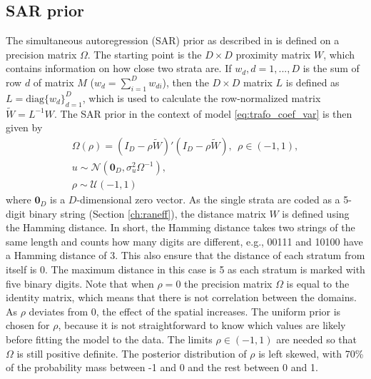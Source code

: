 \subsection{SAR prior}
The simultaneous autoregression (SAR) prior as described in \cite{chung_bayesian_2020} is defined on a precision matrix $\Omega$.
The starting point is the $D\times D$ proximity matrix $W$, which contains information on how close two strata are.
If $w_d, d = 1, ..., D$ is the sum of row $d$ of matrix $M$ ($w_d = \displaystyle \sum_{i = 1}^D w_{di}$), then the $D \times D$ matrix $L$ is defined as $L = \text{diag}\{w_d\}_{d=1}^D$, which is used to calculate the row-normalized matrix $\tilde W = L^{-1}W$.
The SAR prior in the context of model \ref{eq:trafo_coef_var} is then given by
\begin{gather*}
    \Omega(\rho) = (I_D - \rho \tilde W)'(I_D - \rho \tilde W), ~~ \rho \in (-1, 1),\\
    u \sim \mathcal N(\boldsymbol{0}_D, \sigma_u^2 \Omega^{-1}),\\
    \rho \sim \mathcal U(-1, 1)
\end{gather*}
where $\boldsymbol{0}_D$ is a $D$-dimensional zero vector.
As the single strata are coded as a 5-digit binary string (Section \ref{ch:raneff}), the distance matrix $W$ is defined using the Hamming distance.
In short, the Hamming distance takes two strings of the same length and counts how many digits are different, e.g., 00111 and 10100 have a Hamming distance of 3.
This also ensure that the distance of each stratum from itself is 0.
The maximum distance in this case is 5 as each stratum is marked with five binary digits.
Note that when $\rho = 0$ the precision matrix $\Omega$ is equal to the identity matrix, which means that there is not correlation between the domains.
As $\rho$ deviates from 0, the effect of the spatial increases.
The uniform prior is chosen for $\rho$, because it is not straightforward to know which values are likely before fitting the model to the data.
The limits $\rho \in (-1, 1)$ are needed so that $\Omega$ is still positive definite.
The posterior distribution of $\rho$ is left skewed, with 70\% of the probability mass between -1 and 0 and the rest between 0 and 1.

